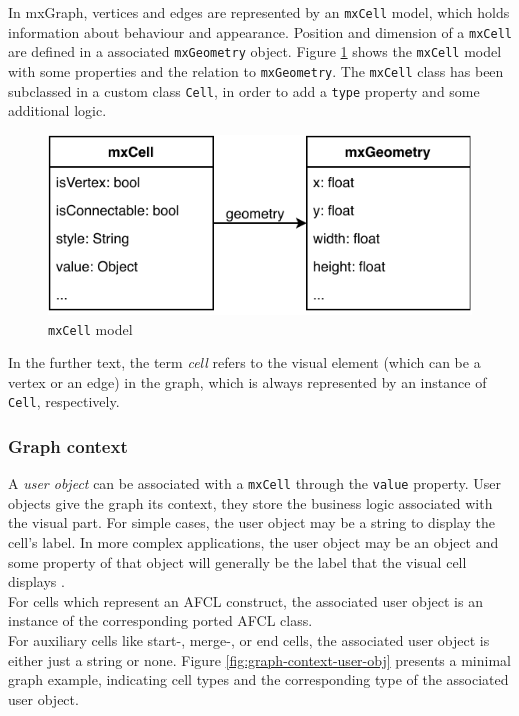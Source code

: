 \documentclass[a4paper,top=25mm,bottom=25mm,12pt,pdftex,halfparskip,twoside,openany,bibtotoc,numbers=noenddot]{scrbook}
\begin{document}
In mxGraph, vertices and edges are represented by an \texttt{mxCell} model, which holds information about behaviour and appearance. Position and dimension of a \texttt{mxCell} are defined in a associated \texttt{mxGeometry} object. Figure \ref{fig:mxcell-model} shows the \texttt{mxCell} model with some properties and the relation to \texttt{mxGeometry}. The \texttt{mxCell} class has been subclassed in a custom class \texttt{Cell}, in order to add a \texttt{type} property and some additional logic.

\begin{figure}[H]
  \centering
  \includegraphics[]{mxCell}
  \caption{\texttt{mxCell} model}
  \label{fig:mxcell-model}
\end{figure}

In the further text, the term \textit{cell} refers to the visual element (which can be a vertex or an edge) in the graph, which is always represented by an instance of \texttt{Cell}, respectively.

\subsubsection{Graph context}

A \textit{user object} can be associated with a \texttt{mxCell} through the \texttt{value} property. User objects give the graph its context, they store the business logic associated with the visual part. For simple cases, the user object may be a string to display the cell's label. In more complex applications, the user object may be an object and some property of that object will generally be the label that the visual cell displays \cite{manuals-mxgraph-user-manual}.\\
For cells which represent an AFCL construct, the associated user object is an instance of the corresponding ported AFCL class.\\
For auxiliary cells like start-, merge-, or end cells, the associated user object is either just a string or none. Figure \ref{fig:graph-context-user-obj} presents a minimal graph example, indicating cell types and the corresponding type of the associated user object.
\end{document}
